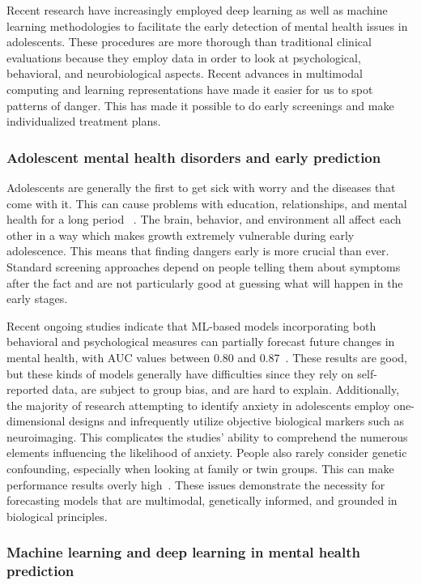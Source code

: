 \documentclass[10pt,letterpaper]{article}
\begin{document}
        Recent research have increasingly employed deep learning as well as machine learning methodologies to facilitate the early detection of mental health issues in adolescents. These procedures are more thorough than traditional clinical evaluations because they employ data in order to look at psychological, behavioral, and neurobiological aspects. Recent advances in multimodal computing and learning representations have made it easier for us to spot patterns of danger. This has made it possible to do early screenings and make individualized treatment plans.

        \subsubsection*{Adolescent mental health disorders and early prediction}
        Adolescents are generally the first to get sick with worry and the diseases that come with it. This can cause problems with education, relationships, and mental health for a long period ~\cite{ref36,ref37}. The brain, behavior, and environment all affect each other in a way which makes growth extremely vulnerable during early adolescence. This means that finding dangers early is more crucial than ever. Standard screening approaches depend on people telling them about symptoms after the fact and are not particularly good at guessing what will happen in the early stages.

        Recent ongoing studies indicate that ML-based models incorporating both behavioral and psychological measures can partially forecast future changes in mental health, with AUC values between 0.80 and 0.87~\cite{ref18,ref19}. These results are good, but these kinds of models generally have difficulties since they rely on self-reported data, are subject to group bias, and are hard to explain. Additionally, the majority of research attempting to identify anxiety in adolescents employ one-dimensional designs and infrequently utilize objective biological markers such as neuroimaging. This complicates the studies' ability to comprehend the numerous elements influencing the likelihood of anxiety. People also rarely consider genetic confounding, especially when looking at family or twin groups. This can make performance results overly high~\cite{ref32,ref33}. These issues demonstrate the necessity for forecasting models that are multimodal, genetically informed, and grounded in biological principles.

        \subsubsection*{Machine learning and deep learning in mental health prediction}
\end{document}
